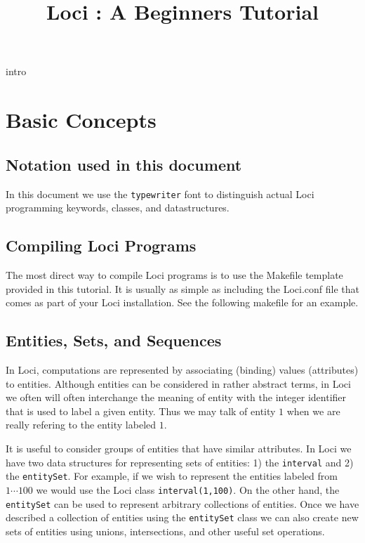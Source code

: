 \documentclass[10pt,epsf]{book}
\title { Loci : A Beginners Tutorial }
\begin{document}
\tableofcontents
\listoffigures
\maketitle
 {intro}

\chapter{ Basic Concepts }

\section{Notation used in this document}

In this document we use the {\tt typewriter} font to distinguish
actual Loci programming keywords, classes, and datastructures.

\section{ Compiling Loci Programs }

The most direct way to compile Loci programs is to use the Makefile
template provided in this tutorial.  It is usually as simple as
including the Loci.conf file that comes as part of your Loci
installation.  See the following makefile for an example.





\section{Entities, Sets, and Sequences}

In Loci, computations are represented by associating (binding) values
(attributes) to entities.  Although entities can be considered in
rather abstract terms, in Loci we often will often interchange the
meaning of entity with the integer identifier that is used to label a
given entity.  Thus we may talk of entity $1$ when we are really
refering to the entity labeled $1$.  

It is useful to consider groups of entities that have similar
attributes.  In Loci we have two data structures for representing sets
of entities:  1) the {\tt interval} and 2) the {\tt entitySet}.  For
example, if we wish to represent the entities labeled from $1 \cdots
100$ we would use the Loci class {\tt interval(1,100)}.  On the other
hand, the {\tt entitySet} can be used to represent arbitrary
collections of entities.  Once we have described a collection of
entities using the {\tt entitySet} class we can also create new sets
of entities using unions, intersections, and other useful set
operations.  
\end{document}
